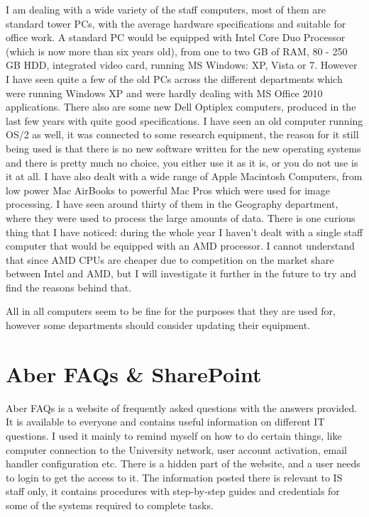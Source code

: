 \documentclass[10pt,a4paper,headinclude=true,twoside]{report}
\begin{document}
I am dealing with a wide variety of the staff computers, most of them are standard tower PCs, with the average hardware specifications and suitable for office work. A standard PC would be equipped with Intel Core Duo Processor (which is now more than six years old), from one to two GB of RAM, 80 - 250 GB HDD, integrated video card, running MS Windows: XP, Vista or 7. However I have seen quite a few of the old PCs across the different departments which were running Windows XP and were hardly dealing with MS Office 2010 applications. There also are some new Dell Optiplex computers, produced in the last few years with quite good specifications. I have seen an old computer running OS/2 as well, it was connected to some research equipment, the reason for it still being used is that there is no new software written for the new operating systems and there is pretty much no choice, you either use it as it is, or you do not use is it at all. I have also dealt with a wide range of Apple Macintosh Computers, from low power Mac AirBooks to powerful Mac Pros which were used for image processing. I have seen around thirty of them in the Geography department, where they were used to process the large amounts of data. There is one curious thing that I have noticed: during the whole year I haven't dealt with a single staff computer that would be equipped with an AMD processor. I cannot understand that since AMD CPUs are cheaper due to competition on the market share between Intel and AMD, but I will investigate it further in the future to try and find the reasons behind that.

All in all computers seem to be fine for the purposes that they are used for, however some departments should consider updating their equipment. 

\section{Aber FAQs \& SharePoint}
Aber FAQs is a website of frequently asked questions with the answers provided. It is available to everyone and contains useful information on different IT questions. I used it mainly to remind myself on how to do certain things, like computer connection to the University network, user account activation, email handler configuration etc. There is a hidden part of the website, and a user needs to login to get the access to it. The information posted there is relevant to IS staff only, it contains procedures with step-by-step guides and credentials for some of the systems required to complete tasks.
\end{document}
